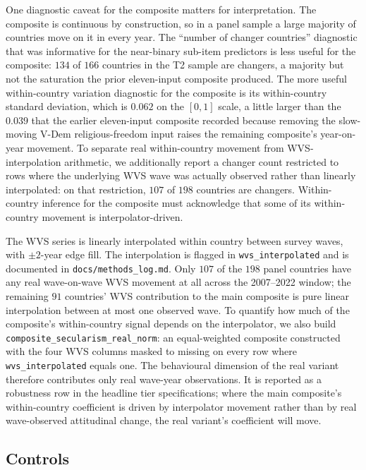\documentclass[12pt,a4paper]{article}
\begin{document}
One diagnostic caveat for the composite matters for interpretation. The composite is continuous by construction, so in a panel sample a large majority of countries move on it in every year. The ``number of changer countries'' diagnostic that was informative for the near-binary sub-item predictors is less useful for the composite: $134$ of $166$ countries in the T2 sample are changers, a majority but not the saturation the prior eleven-input composite produced. The more useful within-country variation diagnostic for the composite is its within-country standard deviation, which is $0.062$ on the $[0, 1]$ scale, a little larger than the $0.039$ that the earlier eleven-input composite recorded because removing the slow-moving V-Dem religious-freedom input raises the remaining composite's year-on-year movement. To separate real within-country movement from WVS-interpolation arithmetic, we additionally report a changer count restricted to rows where the underlying WVS wave was actually observed rather than linearly interpolated: on that restriction, $107$ of $198$ countries are changers. Within-country inference for the composite must acknowledge that some of its within-country movement is interpolator-driven.

The WVS series is linearly interpolated within country between survey waves, with $\pm 2$-year edge fill. The interpolation is flagged in \texttt{wvs\_interpolated} and is documented in \texttt{docs/methods\_log.md}. Only $107$ of the $198$ panel countries have any real wave-on-wave WVS movement at all across the 2007--2022 window; the remaining $91$ countries' WVS contribution to the main composite is pure linear interpolation between at most one observed wave. To quantify how much of the composite's within-country signal depends on the interpolator, we also build \texttt{composite\_secularism\_real\_norm}: an equal-weighted composite constructed with the four WVS columns masked to missing on every row where \texttt{wvs\_interpolated} equals one. The behavioural dimension of the real variant therefore contributes only real wave-year observations. It is reported as a robustness row in the headline tier specifications; where the main composite's within-country coefficient is driven by interpolator movement rather than by real wave-observed attitudinal change, the real variant's coefficient will move.

\subsection{Controls}
\end{document}
